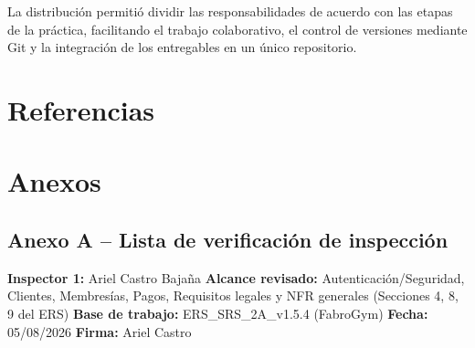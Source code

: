 \documentclass[11pt,a4paper]{article}
\begin{document}
La distribución permitió dividir las responsabilidades de acuerdo con las etapas de la práctica, facilitando el trabajo colaborativo, el control de versiones mediante Git y la integración de los entregables en un único repositorio.


\section{Referencias}



\section{Anexos}

\subsection*{Anexo A -- Lista de verificación de inspección}


\textbf{Inspector 1:} Ariel Castro Bajaña \quad
\textbf{Alcance revisado:} Autenticación/Seguridad, Clientes, Membresías, Pagos, Requisitos legales y NFR generales (Secciones 4, 8, 9 del ERS) \quad
\textbf{Base de trabajo:} ERS\_SRS\_2A\_v1.5.4 (FabroGym) \quad
\textbf{Fecha:} 05/08/2026 \quad \textbf{Firma:} Ariel Castro
\end{document}
